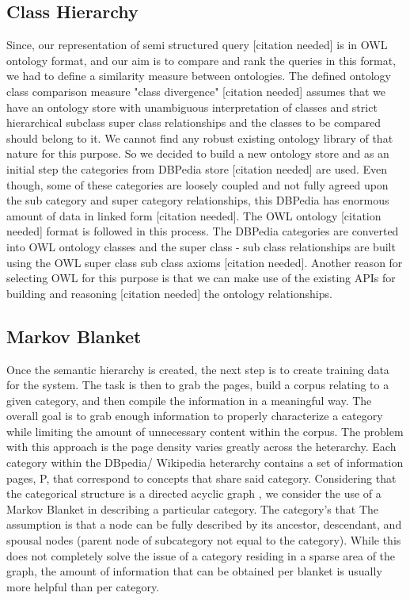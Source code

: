 \documentclass{www2010-submission}
\begin{document}
\subsection{Class Hierarchy} 
Since, our representation of semi structured query [citation needed] is in OWL ontology format, and our aim is to compare and rank the queries in this format, we had to define a similarity measure between ontologies. The defined ontology class comparison measure "class divergence" [citation needed] assumes that we have an ontology store with unambiguous interpretation of classes and strict hierarchical subclass super class relationships and the classes to be compared should belong to it. We cannot find any robust existing ontology library of that nature for this purpose. So we decided to build a new ontology store and as an initial step the categories from DBPedia store [citation needed] are used. Even though, some of these categories are loosely coupled and not fully agreed upon the sub category and super category relationships, this DBPedia has enormous amount of data in linked form [citation needed]. The OWL ontology [citation needed] format is followed in this process. The DBPedia categories are converted into OWL ontology classes and the super class - sub class relationships are built using the OWL super class sub class axioms [citation needed]. Another reason for selecting OWL for this purpose is that we can make use of the existing APIs for building and reasoning [citation needed] the ontology relationships.    



\subsection*{Markov Blanket}
Once the semantic hierarchy is created, the next step is to create training data for the system. The task is then to grab the pages, build a corpus relating to a given category, and then compile the information in a meaningful way. The overall goal is to grab enough information to properly characterize a category while limiting the amount of unnecessary content within the corpus. The problem with this approach is the page density varies greatly across the heterarchy. Each category within the DBpedia/ Wikipedia heterarchy contains a set of information pages, P, that correspond to concepts that share said category. Considering that the categorical structure is a directed acyclic graph \cite{Suchanek07yago:a}, we consider the use of a Markov Blanket \cite{Friedman97bayesiannetwork} in describing a particular category. The category's that The assumption is that a node can be fully described by its ancestor, descendant, and spousal nodes (parent node of subcategory not equal to the category). While this does not completely solve the issue of a category residing in a sparse area of the graph, the amount of information that can be obtained per blanket is usually more helpful than per category.
\end{document}
